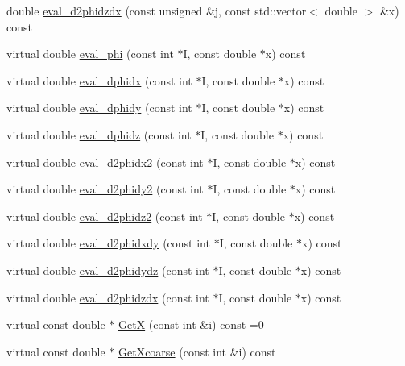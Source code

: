 \begin{DoxyCompactItemize}
\item 
double \mbox{\hyperlink{classfemus_1_1basis_aff9731d83408aa82eb148b8fc83ef9d8}{eval\+\_\+d2phidzdx}} (const unsigned \&j, const std\+::vector$<$ double $>$ \&x) const
\item 
virtual double \mbox{\hyperlink{classfemus_1_1basis_a89b0797cdccffae5ff6d059b32016ae5}{eval\+\_\+phi}} (const int $\ast$I, const double $\ast$x) const
\item 
virtual double \mbox{\hyperlink{classfemus_1_1basis_a4db7d29cf8a753ddbccc4a297dafa0bf}{eval\+\_\+dphidx}} (const int $\ast$I, const double $\ast$x) const
\item 
virtual double \mbox{\hyperlink{classfemus_1_1basis_a2819fac9aae797156b9efec8a0b85cc1}{eval\+\_\+dphidy}} (const int $\ast$I, const double $\ast$x) const
\item 
virtual double \mbox{\hyperlink{classfemus_1_1basis_affd9927f6e25e264108219d862b8cb3d}{eval\+\_\+dphidz}} (const int $\ast$I, const double $\ast$x) const
\item 
virtual double \mbox{\hyperlink{classfemus_1_1basis_a0a9839e75d1c9c8302486fc072eed028}{eval\+\_\+d2phidx2}} (const int $\ast$I, const double $\ast$x) const
\item 
virtual double \mbox{\hyperlink{classfemus_1_1basis_a0febb29fe4b32213ff8d6d428f7241cd}{eval\+\_\+d2phidy2}} (const int $\ast$I, const double $\ast$x) const
\item 
virtual double \mbox{\hyperlink{classfemus_1_1basis_a9d32da05f49ba2c989fec04fb7836c39}{eval\+\_\+d2phidz2}} (const int $\ast$I, const double $\ast$x) const
\item 
virtual double \mbox{\hyperlink{classfemus_1_1basis_ac9feaf9e60421143db2a3708f3c7fa48}{eval\+\_\+d2phidxdy}} (const int $\ast$I, const double $\ast$x) const
\item 
virtual double \mbox{\hyperlink{classfemus_1_1basis_ab9e060e9c9e763d8c10fdffcc5e0b774}{eval\+\_\+d2phidydz}} (const int $\ast$I, const double $\ast$x) const
\item 
virtual double \mbox{\hyperlink{classfemus_1_1basis_a5d619ec5bd57b7d2dc34a99d69975c77}{eval\+\_\+d2phidzdx}} (const int $\ast$I, const double $\ast$x) const
\item 
virtual const double $\ast$ \mbox{\hyperlink{classfemus_1_1basis_a00597122bbc75877f1c184f8fce4986c}{GetX}} (const int \&i) const =0
\item 
virtual const double $\ast$ \mbox{\hyperlink{classfemus_1_1basis_afcabbbda61ede8f30158fe08ee0a5258}{Get\+Xcoarse}} (const int \&i) const
\item 

\end{DoxyCompactItemize}
